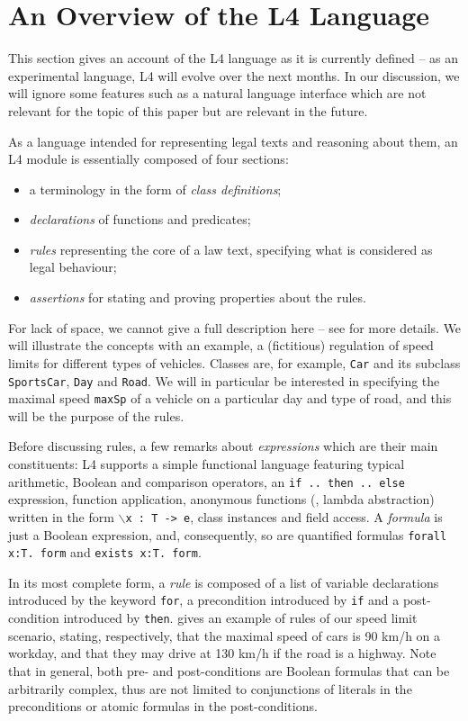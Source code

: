 \section{An Overview of the L4 Language}\label{sec:l4_language}

This section gives an account of the L4 language as it is currently defined --
as an experimental language, L4 will evolve over the next months. In our
discussion, we will ignore some features such as a natural language interface
\cite{listemnmaa2021cnl} which are not relevant for the topic of this paper but are relevant in the future.

As a language intended for representing legal texts and reasoning about them,
an L4 module is essentially composed of four sections:
\begin{itemize}
\item a terminology in the form of \emph{class definitions};
\item \emph{declarations} of functions and predicates;
\item \emph{rules} representing the core of a law text, specifying what is
  considered as legal behaviour;
\item \emph{assertions} for stating and proving properties about the rules.
\end{itemize}

For lack of space, we cannot give a full description here -- see
 for more details. 
We will illustrate the concepts with an example, a (fictitious) regulation of speed
limits for different types of vehicles. Classes are, for example, \texttt{Car}
and its subclass \texttt{SportsCar}, \texttt{Day} and \texttt{Road}. We will
in particular be interested in specifying the maximal speed \texttt{maxSp} of
a vehicle on a particular day and type of road, and this will be the purpose
of the rules.

Before discussing rules, a few remarks about \emph{expressions} which are
their main constituents: L4 supports a simple functional language featuring
typical arithmetic, Boolean and comparison operators, an \texttt{if .. then
  .. else} expression, function application, anonymous functions (\ie, lambda
abstraction) written in the form \texttt{$\backslash$x : T -> e}, class
instances and field access. A \emph{formula} is just a
Boolean expression, and, consequently, so are quantified formulas
\texttt{forall x:T. form} and \texttt{exists x:T. form}.

In its most complete form, a \emph{rule} is composed of a list of variable
declarations introduced by the keyword \texttt{for}, a precondition introduced
by \texttt{if} and a post-condition introduced by
\texttt{then}.  gives an example of rules of our speed limit
scenario, stating, respectively, that the maximal speed of cars is 90 km/h on a
workday,
and that they may drive at 130 km/h if the road is a highway.  Note that in
general, both pre- and post-conditions are Boolean formulas that can be
arbitrarily complex, thus are not limited to conjunctions of literals in the
preconditions or atomic formulas in the post-conditions.

